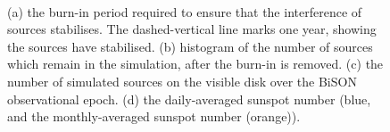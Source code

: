 \begin{figure}[!ht]
	\centering
	\qquad
	 \\
	
	\qquad
	
	\qquad
	
	\caption{(a) the burn-in period required to ensure that the interference of sources stabilises. The dashed-vertical line marks one year, showing the sources have stabilised. (b) histogram of the number of sources which remain in the simulation, after the burn-in is removed. (c) the number of simulated sources on the visible disk over the BiSON observational epoch. (d) the daily-averaged sunspot number (blue, and the monthly-averaged sunspot number (orange)).}
	\label{fig:artificial_sim_config}
\end{figure}


